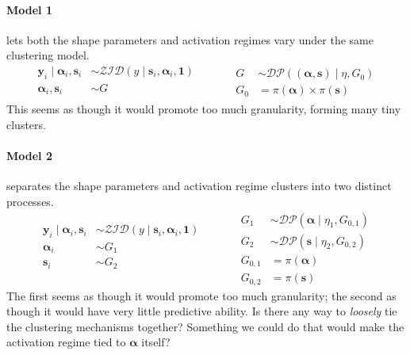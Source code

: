 \documentclass{article}
\begin{document}
\paragraph{Model 1} lets both the shape parameters and activation regimes vary under the same clustering model.  
\[
    \begin{aligned}
    \bm{y}_i\mid\bm{\alpha}_i,\bm{s}_i &\sim \mathcal{ZID}(y\mid \bm{s}_i,\bm{\alpha}_i, \bm{1})\\
    \bm{\alpha}_i, \bm{s}_i &\sim G\\
    \end{aligned}
    \;\hspace{1cm}\;
    \begin{aligned}
    G &\sim \mathcal{DP}\left((\bm{\alpha}, \bm{s}) \mid \eta, G_0\right)\\
    G_0 &= \pi(\bm{\alpha})\times\pi(\bm{s})
    \end{aligned}
\]
This seems as though it would promote too much granularity, forming many tiny clusters.

\paragraph{Model 2} separates the shape parameters and activation regime clusters into two distinct processes.
\[
    \begin{aligned}
    \bm{y}_i\mid\bm{\alpha}_i,\bm{s}_i &\sim \mathcal{ZID}(y\mid \bm{s}_i,\bm{\alpha}_i, \bm{1})\\
    \bm{\alpha}_i &\sim G_1\\
    \bm{s}_i &\sim G_2\\
    \end{aligned}
    \;\hspace{1cm}\;
    \begin{aligned}
    G_1 &\sim \mathcal{DP}(\bm{\alpha}\mid\eta_1,G_{0,1})\\
    G_2 &\sim \mathcal{DP}(\bm{s}\mid\eta_2,G_{0,2})\\
    G_{0,1} &= \pi(\bm{\alpha})\\
    G_{0,2} &= \pi(\bm{s})
    \end{aligned}
\]
The first seems as though it would promote too much granularity; the second as though it would have very little predictive ability.  Is there any way to \emph{loosely} tie the clustering mechanisms together?  Something we could do that would make the activation regime tied to $\bm{\alpha}$ itself?
\end{document}
